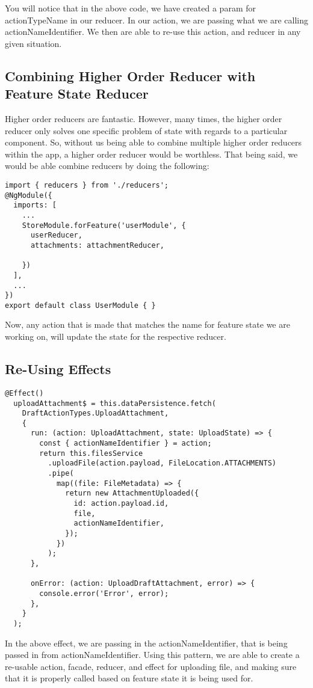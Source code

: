 You will notice that in the above code, we have created a param for
actionTypeName in our reducer. In our action, we are passing what we are calling
actionNameIdentifier. We then are able to re-use this action, and reducer in any
given situation.

\subsection{Combining Higher Order Reducer with Feature State Reducer }

Higher order reducers are fantastic. However, many times, the higher order
reducer only solves one specific problem of state with regards to a particular
component. So, without us being able to combine multiple higher order reducers
within the app, a higher order reducer would be worthless. That being said, we
would be able combine reducers by doing the following:

\begin{lstlisting}
import { reducers } from './reducers';
@NgModule({
  imports: [
    ...
    StoreModule.forFeature('userModule', {
      userReducer,
      attachments: attachmentReducer,

    })
  ],
  ...
})
export default class UserModule { }
\end{lstlisting}

Now, any action that is made that matches the name for feature state we are
working on, will update the state for the respective reducer.

\subsection{Re-Using Effects}
\begin{lstlisting}
@Effect()
  uploadAttachment$ = this.dataPersistence.fetch(
    DraftActionTypes.UploadAttachment,
    {
      run: (action: UploadAttachment, state: UploadState) => {
        const { actionNameIdentifier } = action;
        return this.filesService
          .uploadFile(action.payload, FileLocation.ATTACHMENTS)
          .pipe(
            map((file: FileMetadata) => {
              return new AttachmentUploaded({
                id: action.payload.id,
                file,
                actionNameIdentifier,
              });
            })
          );
      },

      onError: (action: UploadDraftAttachment, error) => {
        console.error('Error', error);
      },
    }
  );
\end{lstlisting}

In the above effect, we are passing in the actionNameIdentifier, that is being
passed in from actionNameIdentifier. Using this pattern, we are able to create a
re-usable action, facade, reducer, and effect for uploading file, and making
sure that it is properly called based on feature state it is being used for.
